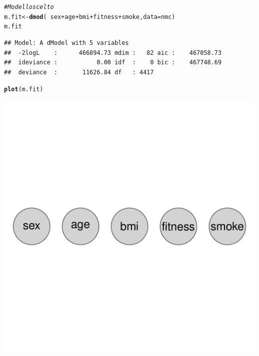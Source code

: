 \documentclass{article}\usepackage[]{graphicx}\usepackage[]{xcolor}
\makeatletter
\def\maxwidth{ %
  \ifdim\Gin@nat@width>\linewidth
    \linewidth
  \else
    \Gin@nat@width
  \fi
}
\newcommand{\hlcom}[1]{\textcolor[rgb]{0.678,0.584,0.686}{\textit{#1}}}%
\newcommand{\hlopt}[1]{\textcolor[rgb]{0,0,0}{#1}}%
\newcommand{\hlstd}[1]{\textcolor[rgb]{0.345,0.345,0.345}{#1}}%
\newcommand{\hlkwb}[1]{\textcolor[rgb]{0.69,0.353,0.396}{#1}}%
\newcommand{\hlkwc}[1]{\textcolor[rgb]{0.333,0.667,0.333}{#1}}%
\newcommand{\hlkwd}[1]{\textcolor[rgb]{0.737,0.353,0.396}{\textbf{#1}}}%
\newenvironment{kframe}{%
 \def\at@end@of@kframe{}%
 \ifinner\ifhmode%
  \def\at@end@of@kframe{\end{minipage}}%
  \begin{minipage}{\columnwidth}%
 \fi\fi%
 \def\FrameCommand##1{\hskip\@totalleftmargin \hskip-\fboxsep
 \colorbox{shadecolor}{##1}\hskip-\fboxsep
     \hskip-\linewidth \hskip-\@totalleftmargin \hskip\columnwidth}%
 \MakeFramed {\advance\hsize-\width
   \@totalleftmargin\z@ \linewidth\hsize
   \@setminipage}}%
 {\par\unskip\endMakeFramed%
 \at@end@of@kframe}
\newenvironment{knitrout}{}{} %
\makeatother
\begin{document}
\begin{knitrout}
\color{fgcolor}\begin{kframe}
\begin{alltt}
\hlcom{#Modello scelto}
\hlstd{m.fit} \hlkwb{<-} \hlkwd{dmod}\hlstd{(}\hlopt{~}\hlstd{sex}\hlopt{+}\hlstd{age}\hlopt{+}\hlstd{bmi}\hlopt{+}\hlstd{fitness}\hlopt{+}\hlstd{smoke,} \hlkwc{data}\hlstd{=nmc)}
\hlstd{m.fit}
\end{alltt}
\begin{verbatim}
## Model: A dModel with 5 variables
##  -2logL    :      466894.73 mdim :   82 aic :    467058.73 
##  ideviance :           0.00 idf  :    0 bic :    467748.69 
##  deviance  :       11626.84 df   : 4417
\end{verbatim}
\begin{alltt}
\hlkwd{plot}\hlstd{(m.fit)}
\end{alltt}
\end{kframe}
\includegraphics[width=\maxwidth]{figure/VisualizzazioneGrafoModello-1} 
\end{knitrout}

\clearpage
\end{document}
